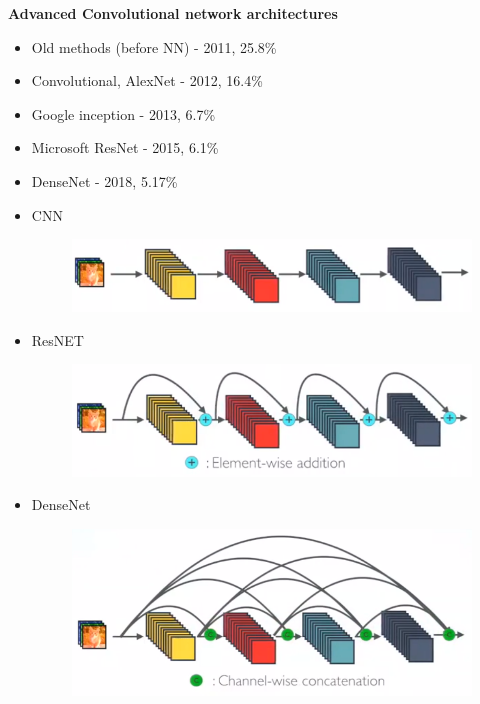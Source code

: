 \documentclass[xcolor=dvipsnames]{beamer}
\begin{document}
\begin{frame}{\bf Advanced Convolutional network architectures}
\begin{itemize}
  \item Old methods (before NN) - 2011, 25.8\%
  \item Convolutional, AlexNet - 2012, 16.4\%
  \item Google inception - 2013, 6.7\%
  \item Microsoft ResNet - 2015, 6.1\%
  \item DenseNet - 2018, 5.17\%
\end{itemize}

\begin{itemize}

    \item CNN
    \begin{figure}
      \includegraphics[scale=0.15]{../../diagrams/dnn_conv.png}
    \end{figure}

    \item ResNET
    \begin{figure}
      \includegraphics[scale=0.15]{../../diagrams/dnn_resnet.png}
    \end{figure}

    \item DenseNet
    \begin{figure}
      \includegraphics[scale=0.15]{../../diagrams/dnn_densenet.png}
    \end{figure}

\end{itemize}

\end{frame}
\end{document}
